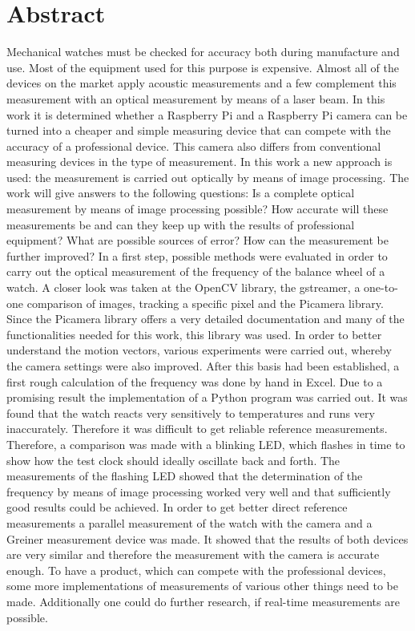 \documentclass[12pt, a4paper]{report}
\begin{document}
\chapter*{Abstract}
Mechanical watches must be checked for accuracy both during manufacture and use. Most of the equipment used for this purpose is expensive. Almost all of the devices on the market apply acoustic measurements and a few complement this measurement with an optical measurement by means of a laser beam. In this work it is determined whether a Raspberry Pi and a Raspberry Pi camera can be turned into a cheaper and simple measuring device that can compete with the accuracy of a professional device. This camera also differs from conventional measuring devices in the type of measurement. In this work a new approach is used: the measurement is carried out optically by means of image processing. 
\newline
The work will give answers to the following questions: Is a complete optical measurement by means of image processing possible? How accurate will these measurements be and can they keep up with the results of professional equipment? What are possible sources of error? How can the measurement be further improved? 
\newline
In a first step, possible methods were evaluated in order to carry out the optical measurement of the frequency of the balance wheel of a watch. A closer look was taken at the OpenCV library, the gstreamer, a one-to-one comparison of images, tracking a specific pixel and the Picamera library. Since the Picamera library offers a very detailed documentation and many of the functionalities needed for this work, this library was used. In order to better understand the motion vectors, various experiments were carried out, whereby the camera settings were also improved. After this basis had been established, a first rough calculation of the frequency was done by hand in Excel. Due to a promising result the implementation of a Python program was carried out. It was found that the watch reacts very sensitively to temperatures and runs very inaccurately. Therefore it was difficult to get reliable reference measurements. Therefore, a comparison was made with a blinking LED, which flashes in time to show how the test clock should ideally oscillate back and forth. The measurements of the flashing LED showed that the determination of the frequency by means of image processing worked very well and that sufficiently good results could be achieved. In order to get better direct reference measurements a parallel measurement of the watch with the camera and a Greiner measurement device was made. It showed that the results of both devices are very similar and therefore the measurement with the camera is accurate enough. To have a product, which can compete with the professional devices, some more implementations of measurements of various other things need to be made. Additionally one could do further research, if real-time measurements are possible.
\end{document}
